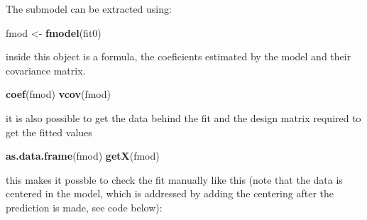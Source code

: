 \documentclass[
]{book}
\newenvironment{Shaded}{\begin{snugshade}}{\end{snugshade}}
\newcommand{\AttributeTok}[1]{\textcolor[rgb]{0.13,0.29,0.53}{#1}}
\newcommand{\CommentTok}[1]{\textcolor[rgb]{0.56,0.35,0.01}{\textit{#1}}}
\newcommand{\DecValTok}[1]{\textcolor[rgb]{0.00,0.00,0.81}{#1}}
\newcommand{\FunctionTok}[1]{\textcolor[rgb]{0.13,0.29,0.53}{\textbf{#1}}}
\newcommand{\NormalTok}[1]{#1}
\newcommand{\OtherTok}[1]{\textcolor[rgb]{0.56,0.35,0.01}{#1}}
\newcommand{\SpecialCharTok}[1]{\textcolor[rgb]{0.81,0.36,0.00}{\textbf{#1}}}
\newcommand{\StringTok}[1]{\textcolor[rgb]{0.31,0.60,0.02}{#1}}
\begin{document}
The submodel can be extracted using:

\begin{Shaded}
\begin{Highlighting}[]
\NormalTok{ fmod }\OtherTok{\textless{}{-}} \FunctionTok{fmodel}\NormalTok{(fit0)}
\end{Highlighting}
\end{Shaded}

inside this object is a formula, the coeficients estimated by the model and their covariance matrix.

\begin{Shaded}
\begin{Highlighting}[]
 \FunctionTok{coef}\NormalTok{(fmod)}
 \FunctionTok{vcov}\NormalTok{(fmod)}
\end{Highlighting}
\end{Shaded}

it is also possible to get the data behind the fit and the design matrix required to get the fitted values

\begin{Shaded}
\begin{Highlighting}[]
 \FunctionTok{as.data.frame}\NormalTok{(fmod)}
 \FunctionTok{getX}\NormalTok{(fmod)}
\end{Highlighting}
\end{Shaded}

this makes it possble to check the fit manually like this (note that the data is centered in the model, which is addressed by adding the centering after the prediction is made, see code below):

\begin{Shaded}
\end{Shaded}
\end{document}
